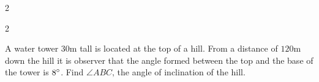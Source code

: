\begin{description}
\begin {multicols}{2}
\item    
\setlength\fboxrule{0in}\setlength\fboxsep{0.2in}
\end {multicols}
 


\columnsep =30pt
\begin {multicols}{2}\item [31.]
 A water tower $30 \mbox{m}$ tall is located at the top of a hill. From
a distance of $120 \mbox{m}$ down the hill it is observer that the angle formed between the top and
the base of the tower is $8 \mbox{{\ensuremath{{}^\circ}}}$. Find $\angle ABC\text{,}$ the angle of inclination of the hill. 

\item    
\setlength\fboxrule{0in}\setlength\fboxsep{0.2in}
\end {multicols}
 \end{description}

